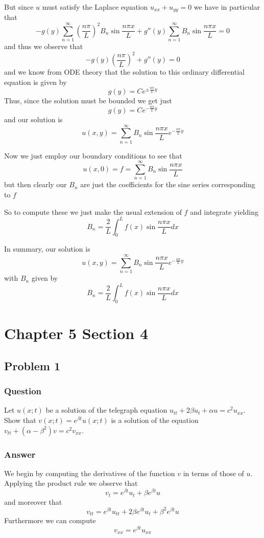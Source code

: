 \documentclass[12pt]{article}
\begin{document}
But since $u$ must satisfy the Laplace equation $u_{xx}+u_{yy}=0$ we have in particular that 
\[-g(y)\sum_{n=1}^\infty \left( \frac{n \pi}{L} \right)^2  B_n \sin{\frac{n \pi x}{L}} + g''(y) \sum_{n=1}^\infty B_n \sin{\frac{n\pi x}{L}} = 0 \]
and thus we observe that 
\[-g(y)  \left( \frac{n \pi}{L} \right)^2  +g''(y) = 0\]
and we know from ODE theory that the solution to this ordinary differential equation is given by
\[g(y)=C e^{\pm \frac{n\pi}{L} y}\]
Thus, since the solution must be bounded we get just
\[g(y)=C e^{- \frac{n\pi}{L} y}\]
and our solution is
\[u(x,y)= \sum_{n=1}^\infty B_n \sin{\frac{n\pi x}{L}} e^{- \frac{n\pi}{L} y}\]

Now we just employ our boundary conditions to see that
\[u(x,0)=f= \sum_{n=1}^\infty B_n \sin{\frac{n\pi x}{L}} \]
but then clearly our $B_n$ are just the coefficients for the sine series corresponding to $f$

So to compute these we just make the usual extension of $f$ and integrate yielding
\[B_n=\frac{2}{L} \int_0^L f(x) \sin{\frac{n \pi x}{L}} dx\]

In summary, our solution is 
\[u(x,y)= \sum_{n=1}^\infty B_n \sin{\frac{n\pi x}{L}} e^{- \frac{n\pi}{L} y}\]
with $B_n$ given by
\[B_n=\frac{2}{L} \int_0^L f(x) \sin{\frac{n \pi x}{L}} dx\]


\section{Chapter 5 Section 4}

\subsection{Problem 1}
\subsubsection{Question}
Let $u(x;t)$ be a solution of the telegraph equation $u_{tt}+2 \beta u_t +\alpha u = c^2 u_{xx} $. Show that $v(x;t) = e^{\beta t}u(x;t)$ is a solution of the equation $v_{tt}+(\alpha-\beta^2)v=c^2v_{xx}$.

\subsubsection{Answer}
We begin by computing the derivatives of the function $v$ in terms of those of $u$. Applying the product rule we observe that
\[v_t=e^{\beta t}u_t+\beta e^{\beta t}u\]
and moreover that
\[v_{tt}=e^{\beta t}u_{tt}+2 \beta e^{\beta t}u_t+\beta^2 e^{\beta t} u\]
Furthermore we can compute
\[v_{xx}=e^{\beta t}u_{xx}\]
\end{document}
